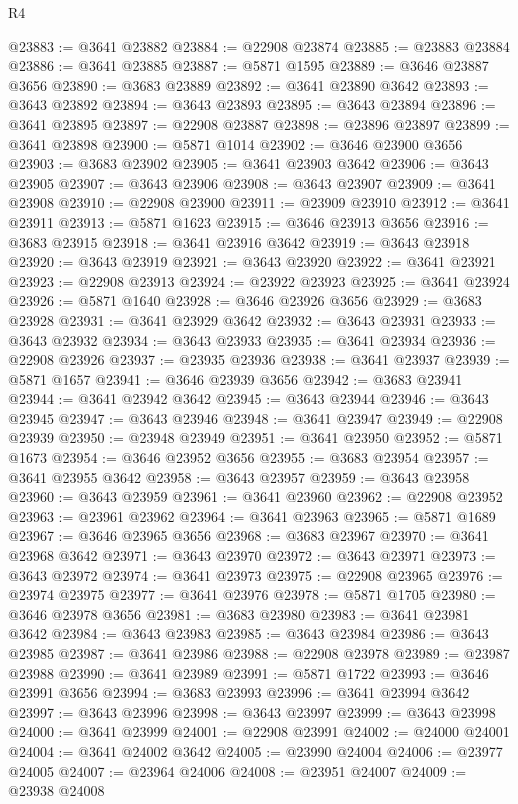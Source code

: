 \begin{lexlean}{R4}
\begin{coremodule}
@23883 := @3641 @23882
@23884 := @22908 @23874
@23885 := @23883 @23884
@23886 := @3641 @23885
@23887 := @5871 @1595
@23889 := @3646 @23887 @3656
@23890 := @3683 @23889
@23892 := @3641 @23890 @3642
@23893 := @3643 @23892
@23894 := @3643 @23893
@23895 := @3643 @23894
@23896 := @3641 @23895
@23897 := @22908 @23887
@23898 := @23896 @23897
@23899 := @3641 @23898
@23900 := @5871 @1014
@23902 := @3646 @23900 @3656
@23903 := @3683 @23902
@23905 := @3641 @23903 @3642
@23906 := @3643 @23905
@23907 := @3643 @23906
@23908 := @3643 @23907
@23909 := @3641 @23908
@23910 := @22908 @23900
@23911 := @23909 @23910
@23912 := @3641 @23911
@23913 := @5871 @1623
@23915 := @3646 @23913 @3656
@23916 := @3683 @23915
@23918 := @3641 @23916 @3642
@23919 := @3643 @23918
@23920 := @3643 @23919
@23921 := @3643 @23920
@23922 := @3641 @23921
@23923 := @22908 @23913
@23924 := @23922 @23923
@23925 := @3641 @23924
@23926 := @5871 @1640
@23928 := @3646 @23926 @3656
@23929 := @3683 @23928
@23931 := @3641 @23929 @3642
@23932 := @3643 @23931
@23933 := @3643 @23932
@23934 := @3643 @23933
@23935 := @3641 @23934
@23936 := @22908 @23926
@23937 := @23935 @23936
@23938 := @3641 @23937
@23939 := @5871 @1657
@23941 := @3646 @23939 @3656
@23942 := @3683 @23941
@23944 := @3641 @23942 @3642
@23945 := @3643 @23944
@23946 := @3643 @23945
@23947 := @3643 @23946
@23948 := @3641 @23947
@23949 := @22908 @23939
@23950 := @23948 @23949
@23951 := @3641 @23950
@23952 := @5871 @1673
@23954 := @3646 @23952 @3656
@23955 := @3683 @23954
@23957 := @3641 @23955 @3642
@23958 := @3643 @23957
@23959 := @3643 @23958
@23960 := @3643 @23959
@23961 := @3641 @23960
@23962 := @22908 @23952
@23963 := @23961 @23962
@23964 := @3641 @23963
@23965 := @5871 @1689
@23967 := @3646 @23965 @3656
@23968 := @3683 @23967
@23970 := @3641 @23968 @3642
@23971 := @3643 @23970
@23972 := @3643 @23971
@23973 := @3643 @23972
@23974 := @3641 @23973
@23975 := @22908 @23965
@23976 := @23974 @23975
@23977 := @3641 @23976
@23978 := @5871 @1705
@23980 := @3646 @23978 @3656
@23981 := @3683 @23980
@23983 := @3641 @23981 @3642
@23984 := @3643 @23983
@23985 := @3643 @23984
@23986 := @3643 @23985
@23987 := @3641 @23986
@23988 := @22908 @23978
@23989 := @23987 @23988
@23990 := @3641 @23989
@23991 := @5871 @1722
@23993 := @3646 @23991 @3656
@23994 := @3683 @23993
@23996 := @3641 @23994 @3642
@23997 := @3643 @23996
@23998 := @3643 @23997
@23999 := @3643 @23998
@24000 := @3641 @23999
@24001 := @22908 @23991
@24002 := @24000 @24001
@24004 := @3641 @24002 @3642
@24005 := @23990 @24004
@24006 := @23977 @24005
@24007 := @23964 @24006
@24008 := @23951 @24007
@24009 := @23938 @24008

\end{coremodule}
\end{lexlean}
